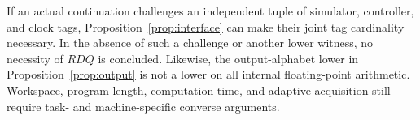 If an actual continuation challenges an independent tuple of simulator, controller, and clock tags, Proposition~\ref{prop:interface} can make their joint tag cardinality necessary. In the absence of such a challenge or another lower witness, no necessity of $RDQ$ is concluded. Likewise, the output-alphabet lower in Proposition~\ref{prop:output} is not a lower on all internal floating-point arithmetic. Workspace, program length, computation time, and adaptive acquisition still require task- and machine-specific converse arguments.
